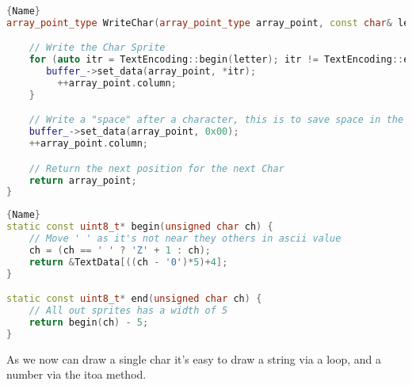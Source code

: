 \noindent\begin{minipage}[t]{.45\textwidth}
\begin{lstlisting}[caption={Drawing a Char},label={lst:draw_char},frame=tlrb, language=C++]{Name}
array_point_type WriteChar(array_point_type array_point, const char& letter){

    // Write the Char Sprite
    for (auto itr = TextEncoding::begin(letter); itr != TextEncoding::end(letter); --itr) {
  	   buffer_->set_data(array_point, *itr);
  		 ++array_point.column;
  	}

    // Write a "space" after a character, this is to save space in the TextData array
    buffer_->set_data(array_point, 0x00);
  	++array_point.column;

    // Return the next position for the next Char
  	return array_point;
}
\end{lstlisting}
\end{minipage}\hfill
\begin{minipage}[t]{.45\textwidth}
\begin{lstlisting}[caption={Calculating Sprite Location},label={lst:sprite_location},frame=tlrb, language=C++]{Name}
static const uint8_t* begin(unsigned char ch) {
    // Move ' ' as it's not near they others in ascii value
    ch = (ch == ' ' ? 'Z' + 1 : ch);
    return &TextData[((ch - '0')*5)+4];
}

static const uint8_t* end(unsigned char ch) {
    // All out sprites has a width of 5
    return begin(ch) - 5;
}
\end{lstlisting}
\end{minipage}

As we now can draw a single char it's easy to draw a string via a loop, and a number via the itoa method.
